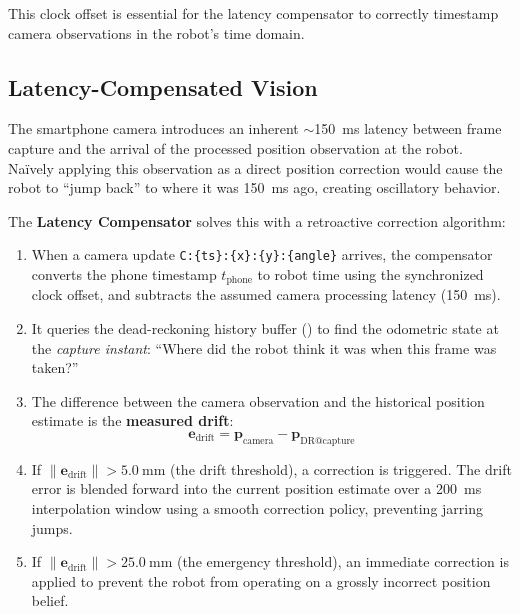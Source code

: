\documentclass[12pt, a4paper, twoside]{article}
\begin{document}
This clock offset is essential for the latency compensator to correctly timestamp camera observations in the robot's time domain.

\subsection{Latency-Compensated Vision}
\label{sec:latency-comp}

The smartphone camera introduces an inherent {$\sim$\SI{150}{\milli\second}} latency between frame capture and the arrival of the processed position observation at the robot. Na\"ively applying this observation as a direct position correction would cause the robot to ``jump back'' to where it was \SI{150}{\milli\second} ago, creating oscillatory behavior.

The \textbf{Latency Compensator} solves this with a retroactive correction algorithm:

\begin{enumerate}
    \item When a camera update \texttt{C:\{ts\}:\{x\}:\{y\}:\{angle\}} arrives, the compensator converts the phone timestamp $t_{\text{phone}}$ to robot time using the synchronized clock offset, and subtracts the assumed camera processing latency (\SI{150}{\milli\second}).

    \item It queries the dead-reckoning history buffer () to find the odometric state at the \emph{capture instant}: ``Where did the robot think it was when this frame was taken?''

    \item The difference between the camera observation and the historical position estimate is the \textbf{measured drift}:
    \begin{equation}
        \mathbf{e}_{\text{drift}} = \mathbf{p}_{\text{camera}} - \mathbf{p}_{\text{DR@capture}}
    \end{equation}

    \item If $\|\mathbf{e}_{\text{drift}}\| > \SI{5.0}{\milli\metre}$ (the drift threshold), a correction is triggered. The drift error is blended forward into the current position estimate over a \SI{200}{\milli\second} interpolation window using a smooth correction policy, preventing jarring jumps.

    \item If $\|\mathbf{e}_{\text{drift}}\| > \SI{25.0}{\milli\metre}$ (the emergency threshold), an immediate correction is applied to prevent the robot from operating on a grossly incorrect position belief.
\end{enumerate}
\end{document}
